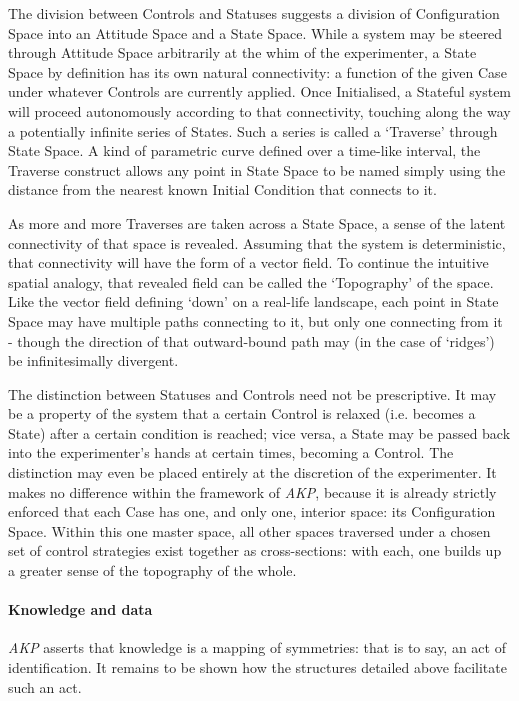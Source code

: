 \documentclass[a4paper,11pt,oneside]{book}
\begin{document}
The division between Controls and Statuses suggests a division of Configuration Space into an Attitude Space and a State Space. While a system may be steered through Attitude Space arbitrarily at the whim of the experimenter, a State Space by definition has its own natural connectivity: a function of the given Case under whatever Controls are currently applied.  Once Initialised, a Stateful system will proceed autonomously according to that connectivity, touching along the way a potentially infinite series of States. Such a series is called a `Traverse' through State Space. A kind of parametric curve defined over a time-like interval, the Traverse construct allows any point in State Space to be named simply using the distance from the nearest known Initial Condition that connects to it.

As more and more Traverses are taken across a State Space, a sense of the latent connectivity of that space is revealed. Assuming that the system is deterministic, that connectivity will have the form of a vector field. To continue the intuitive spatial analogy, that revealed field can be called the `Topography' of the space. Like the vector field defining `down' on a real-life landscape, each point in State Space may have multiple paths connecting to it, but only one connecting from it - though the direction of that outward-bound path may (in the case of `ridges') be infinitesimally divergent.

The distinction between Statuses and Controls need not be prescriptive. It may be a property of the system that a certain Control is relaxed (i.e. becomes a State) after a certain condition is reached; vice versa, a State may be passed back into the experimenter's hands at certain times, becoming a Control. The distinction may even be placed entirely at the discretion of the experimenter. It makes no difference within the framework of \textit{AKP}, because it is already strictly enforced that each Case has one, and only one, interior space: its Configuration Space. Within this one master space, all other spaces traversed under a chosen set of control strategies exist together as cross-sections: with each, one builds up a greater sense of the topography of the whole.

\paragraph{Knowledge and data}

\textit{AKP} asserts that knowledge is a mapping of symmetries: that is to say, an act of identification. It remains to be shown how the structures detailed above facilitate such an act.
\end{document}
